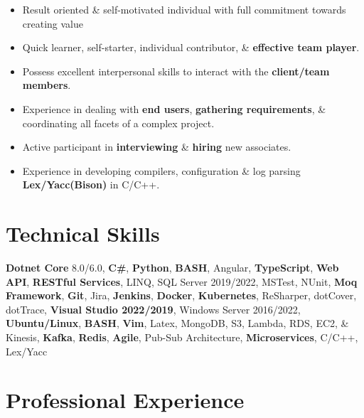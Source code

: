 \documentclass[letterpaper,9pt]{article}
\begin{document}
\begin{itemize}[itemsep=0.5em]
    \item Result oriented \& self-motivated individual with full commitment towards creating value
    \item Quick learner, self-starter, individual contributor, \& \textbf{\color{black}effective team player}.
    \item Possess excellent interpersonal skills to interact with the \textbf{\color{black}client/team members}.
    \item Experience in dealing with \textbf{\color{black}end users}, \textbf{\color{black}gathering requirements}, \& coordinating all facets of a complex project.
    \item Active participant in \textbf{\color{black}interviewing} \& \textbf{\color{black}hiring} new associates.
    \item Experience in developing compilers, configuration \& log parsing \textbf{\color{black}Lex/Yacc(Bison)} in C/C++.
\end{itemize}

\section{Technical Skills}
\textbf{\color{black}Dotnet Core} 8.0/6.0, \textbf{\color{black}C\#}, \textbf{\color{black}Python}, \textbf{\color{black}BASH}, Angular, \textbf{\color{black}TypeScript}, \textbf{\color{black}Web API}, \textbf{\color{black}RESTful Services}, LINQ, SQL Server 2019/2022, MSTest, NUnit, \textbf{\color{black}Moq Framework}, \textbf{\color{black}Git}, Jira, \textbf{\color{black}Jenkins}, \textbf{\color{black}Docker}, \textbf{\color{black}Kubernetes}, ReSharper, dotCover, dotTrace, \textbf{\color{black}Visual Studio 2022/2019}, Windows Server 2016/2022, \textbf{\color{black}Ubuntu/Linux}, \textbf{\color{black}BASH}, \textbf{\color{black}Vim}, Latex, MongoDB, S3, Lambda, RDS, EC2, \& Kinesis, \textbf{\color{black}Kafka}, \textbf{\color{black}Redis}, \textbf{\color{black}Agile}, Pub-Sub Architecture, \textbf{\color{black}Microservices}, C/C++, Lex/Yacc

\pagebreak

\section{Professional Experience}

\end{document}
